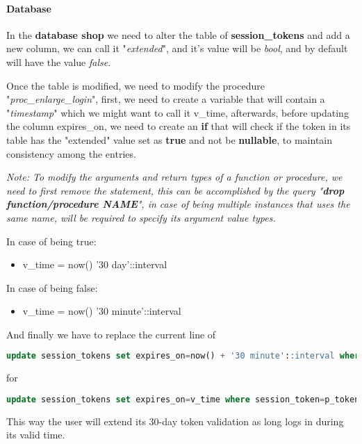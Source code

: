 \paragraph{Database}
\begin{flushleft}
    In the \textbf{database shop} we need to alter the table of \textbf{session\_tokens} and add a new column,
    we can call it "\textit{extended}", and it's value will be \textit{bool}, and by default will have the value \textit{false}.
\end{flushleft}
\begin{flushleft}
    Once the table is modified, we need to modify the procedure "\textit{proc\_enlarge\_login}", first, we need to create
    a variable that will contain a "\textit{timestamp}" which we might want to call it v\_time, afterwards, before
    updating the column expires\_on, we need to create an \textbf{if} that will check if the token in its table has the
    "extended" value set as \textbf{true} and not be \textbf{nullable}, to maintain consistency among the entries.
\end{flushleft}
\begin{flushleft}

    \textit{Note: To modify the arguments and return types of a function or procedure, we need to first remove the
    statement, this can be accomplished by the query "\textbf{drop function/procedure NAME}", in case of being multiple
    instances that uses the same name, will be required to specify its argument value types.}

    In case of being true:
    \begin{itemize}
        \item v\_time = now() '30 day'::interval
    \end{itemize}
    In case of being false:
    \begin{itemize}
        \item v\_time = now() '30 minute'::interval
    \end{itemize}
\newpage
    And finally we have to replace the current line of
    \begin{lstlisting}[language=sql,label={lst:sql_extended1}]
update session_tokens set expires_on=now() + '30 minute'::interval where session_token=p_token and expires_on<now() + '30 minute'::interval and expires_on>now();\end{lstlisting}
    for
    \begin{lstlisting}[language=sql,label={lst:sql_extended2}]
update session_tokens set expires_on=v_time where session_token=p_token and expires_on<v_time and expires_on>now();\end{lstlisting}
    This way the user will extend its 30-day token validation as long logs in during its valid time.

\end{flushleft}
